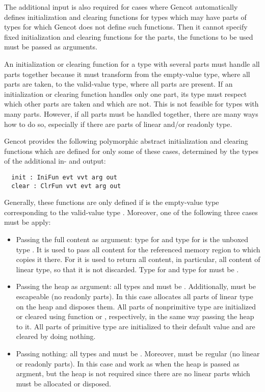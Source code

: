 The additional input is also required for cases where Gencot automatically defines initialization and clearing
functions for types which may have parts of types for which Gencot does not define such functions. Then 
it cannot specify fixed initialization and clearing functions for the parts, the functions to be used must be
passed as arguments.

An initialization or clearing function for a type with several parts must handle all parts together because it must
transform from the empty-value type, where all parts are taken, to the valid-value type, where all parts are present.
If an initialization or clearing function handles only one part, its type must respect which other parts are 
taken and which are not. This is not feasible for types with many parts. However, if all parts must be handled together,
there are many ways how to do so, especially if there are parts of linear and/or readonly type. 

Gencot provides the following polymorphic abstract initialization and clearing functions which are defined for only 
some of these cases, determined by the types of the additional in- and output:
\begin{verbatim}
  init : IniFun evt vvt arg out
  clear : ClrFun vvt evt arg out
\end{verbatim}
Generally, these functions are only defined if  is the empty-value type corresponding to the valid-value
type . Moreover, one of the following three cases must be apply:
\begin{itemize}
\item Passing the full content as argument: type  for  and type  for  is the 
unboxed type . It is used to pass all content for the referenced memory region to  which
copies it there. For  it is used to return all content, in particular, all content of linear type, so that 
it is not discarded. Type  for  and type  for  must be \code{()}.
\item Passing the heap as argument: all types  and  must be . Additionally, 
must be escapeable (no readonly parts). In this case 
allocates all parts of linear type on the heap and  disposes them. All parts of nonprimitive type are
initialized or cleared using function  or , respectively, in the same way passing the heap to 
it. All parts of primitive type are initialized to their default value  and are cleared by
doing nothing. 
\item Passing nothing: all types  and  must be \code{()}. Moreover,  must be regular
(no linear or readonly parts). In this case  and  work as when the heap is passed as argment, 
but the heap is not required since there are no linear parts which must be allocated or disposed.
\end{itemize}

